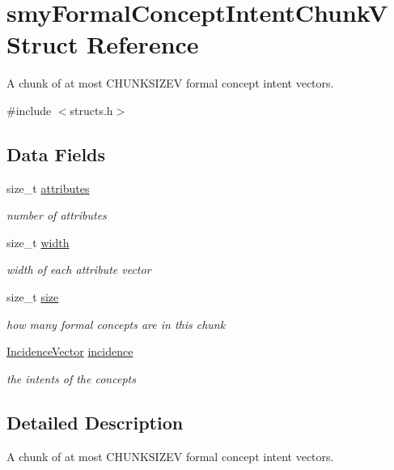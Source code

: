 \hypertarget{structsmyFormalConceptIntentChunkV}{\section{smy\-Formal\-Concept\-Intent\-Chunk\-V \-Struct \-Reference}
\label{structsmyFormalConceptIntentChunkV}
}


\-A chunk of at most \-C\-H\-U\-N\-K\-S\-I\-Z\-E\-V formal concept intent vectors.  




{\ttfamily \#include $<$structs.\-h$>$}

\subsection*{\-Data \-Fields}
\begin{DoxyCompactItemize}
\item 
size\-\_\-t \hyperlink{structsmyFormalConceptIntentChunkV_ab40281b9f96435442255be08563782c0}{attributes}
\begin{DoxyCompactList}\small\item\em number of attributes \end{DoxyCompactList}\item 
size\-\_\-t \hyperlink{structsmyFormalConceptIntentChunkV_a34213d18382955bee724884cd2bfd82c}{width}
\begin{DoxyCompactList}\small\item\em width of each attribute vector \end{DoxyCompactList}\item 
size\-\_\-t \hyperlink{structsmyFormalConceptIntentChunkV_acbb0ea8f58b4a13ecefc5a996c386206}{size}
\begin{DoxyCompactList}\small\item\em how many formal concepts are in this chunk \end{DoxyCompactList}\item 
\hyperlink{vector_8h_aae617489ac88fff15979050721fe581f}{\-Incidence\-Vector} \hyperlink{structsmyFormalConceptIntentChunkV_a12a126936dbafdf7ec85de7fed74eb8c}{incidence}
\begin{DoxyCompactList}\small\item\em the intents of the concepts \end{DoxyCompactList}\end{DoxyCompactItemize}


\subsection{\-Detailed \-Description}
\-A chunk of at most \-C\-H\-U\-N\-K\-S\-I\-Z\-E\-V formal concept intent vectors. 

